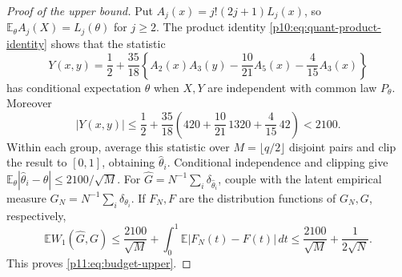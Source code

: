 \documentclass[11pt,letterpaper]{article}
\theoremstyle{definition}
\theoremstyle{remark}
\newcommand{\1}{\mathbf 1}
\begin{document}
\begin{proof}[Proof of the upper bound]
Put $A_j(x)=j!(2j+1)L_j(x)$, so
$\mathbb E_\theta A_j(X)=L_j(\theta)$ for $j\ge2$.
The product identity \eqref{p10:eq:quant-product-identity} shows that the statistic
\[
 Y(x,y)=\frac12+\frac{35}{18}
 \left\{A_2(x)A_3(y)-\frac{10}{21}A_5(x)-\frac4{15}A_3(x)\right\}
\]
has conditional expectation $\theta$ when $X,Y$ are independent
with common law $P_\theta$.  Moreover
\[
 |Y(x,y)|\le\frac12+\frac{35}{18}
       \left(420+\frac{10}{21}\,1320+\frac4{15}\,42\right)<2100.
\]
Within each group, average this statistic over
$M=\lfloor q/2\rfloor$ disjoint pairs and clip the result to $[0,1]$,
obtaining $\widehat\theta_i$.  Conditional independence and clipping give
$\mathbb E_\theta|\widehat\theta_i-\theta|\le2100/\sqrt M$.
For $\widehat G=N^{-1}\sum_i\delta_{\widehat\theta_i}$, couple with
the latent empirical measure $G_N=N^{-1}\sum_i\delta_{\theta_i}$.
If $F_N,F$ are the distribution functions of $G_N,G$, respectively,
\[
 \mathbb E W_1(\widehat G,G)
 \le\frac{2100}{\sqrt M}+\int_0^1\mathbb E|F_N(t)-F(t)|\,dt
 \le\frac{2100}{\sqrt M}+\frac1{2\sqrt N}.
\]
This proves \eqref{p11:eq:budget-upper}.
\end{proof}
\end{document}
